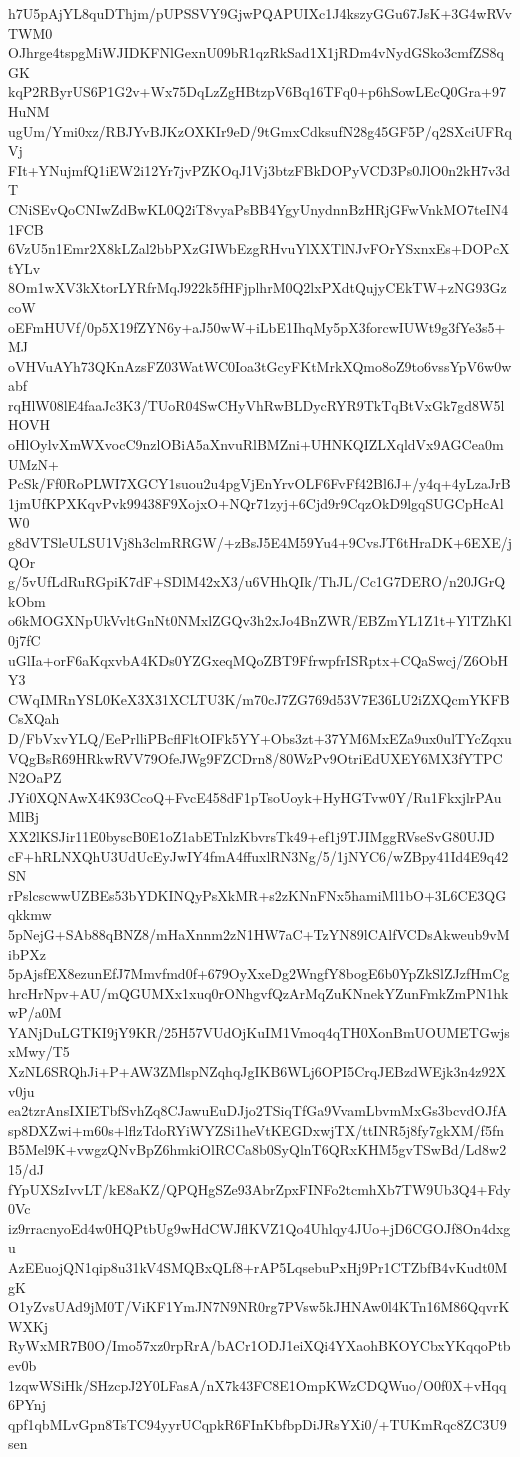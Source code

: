 h7U5pAjYL8quDThjm/pUPSSVY9GjwPQAPUIXc1J4kszyGGu67JsK+3G4wRVvTWM0
OJhrge4tspgMiWJIDKFNlGexnU09bR1qzRkSad1X1jRDm4vNydGSko3cmfZS8qGK
kqP2RByrUS6P1G2v+Wx75DqLzZgHBtzpV6Bq16TFq0+p6hSowLEcQ0Gra+97HuNM
ugUm/Ymi0xz/RBJYvBJKzOXKIr9eD/9tGmxCdksufN28g45GF5P/q2SXciUFRqVj
FIt+YNujmfQ1iEW2i12Yr7jvPZKOqJ1Vj3btzFBkDOPyVCD3Ps0JlO0n2kH7v3dT
CNiSEvQoCNIwZdBwKL0Q2iT8vyaPsBB4YgyUnydnnBzHRjGFwVnkMO7teIN41FCB
6VzU5n1Emr2X8kLZal2bbPXzGIWbEzgRHvuYlXXTlNJvFOrYSxnxEs+DOPcXtYLv
8Om1wXV3kXtorLYRfrMqJ922k5fHFjplhrM0Q2lxPXdtQujyCEkTW+zNG93GzcoW
oEFmHUVf/0p5X19fZYN6y+aJ50wW+iLbE1IhqMy5pX3forcwIUWt9g3fYe3s5+MJ
oVHVuAYh73QKnAzsFZ03WatWC0Ioa3tGcyFKtMrkXQmo8oZ9to6vssYpV6w0wabf
rqHlW08lE4faaJc3K3/TUoR04SwCHyVhRwBLDycRYR9TkTqBtVxGk7gd8W5lHOVH
oHlOylvXmWXvocC9nzlOBiA5aXnvuRlBMZni+UHNKQIZLXqldVx9AGCea0mUMzN+
PcSk/Ff0RoPLWI7XGCY1suou2u4pgVjEnYrvOLF6FvFf42Bl6J+/y4q+4yLzaJrB
1jmUfKPXKqvPvk99438F9XojxO+NQr71zyj+6Cjd9r9CqzOkD9lgqSUGCpHcAlW0
g8dVTSleULSU1Vj8h3clmRRGW/+zBsJ5E4M59Yu4+9CvsJT6tHraDK+6EXE/jQOr
g/5vUfLdRuRGpiK7dF+SDlM42xX3/u6VHhQIk/ThJL/Cc1G7DERO/n20JGrQkObm
o6kMOGXNpUkVvltGnNt0NMxlZGQv3h2xJo4BnZWR/EBZmYL1Z1t+YlTZhKl0j7fC
uGlIa+orF6aKqxvbA4KDs0YZGxeqMQoZBT9FfrwpfrISRptx+CQaSwcj/Z6ObHY3
CWqIMRnYSL0KeX3X31XCLTU3K/m70cJ7ZG769d53V7E36LU2iZXQcmYKFBCsXQah
D/FbVxvYLQ/EePrlliPBcflFltOIFk5YY+Obs3zt+37YM6MxEZa9ux0ulTYcZqxu
VQgBsR69HRkwRVV79OfeJWg9FZCDrn8/80WzPv9OtriEdUXEY6MX3fYTPCN2OaPZ
JYi0XQNAwX4K93CcoQ+FvcE458dF1pTsoUoyk+HyHGTvw0Y/Ru1FkxjlrPAuMlBj
XX2lKSJir11E0byscB0E1oZ1abETnlzKbvrsTk49+ef1j9TJIMggRVseSvG80UJD
cF+hRLNXQhU3UdUcEyJwIY4fmA4ffuxlRN3Ng/5/1jNYC6/wZBpy41Id4E9q42SN
rPslcscwwUZBEs53bYDKINQyPsXkMR+s2zKNnFNx5hamiMl1bO+3L6CE3QGqkkmw
5pNejG+SAb88qBNZ8/mHaXnnm2zN1HW7aC+TzYN89lCAlfVCDsAkweub9vMibPXz
5pAjsfEX8ezunEfJ7Mmvfmd0f+679OyXxeDg2WngfY8bogE6b0YpZkSlZJzfHmCg
hrcHrNpv+AU/mQGUMXx1xuq0rONhgvfQzArMqZuKNnekYZunFmkZmPN1hkwP/a0M
YANjDuLGTKI9jY9KR/25H57VUdOjKuIM1Vmoq4qTH0XonBmUOUMETGwjsxMwy/T5
XzNL6SRQhJi+P+AW3ZMlspNZqhqJgIKB6WLj6OPI5CrqJEBzdWEjk3n4z92Xv0ju
ea2tzrAnsIXIETbfSvhZq8CJawuEuDJjo2TSiqTfGa9VvamLbvmMxGs3bcvdOJfA
sp8DXZwi+m60s+lflzTdoRYiWYZSi1heVtKEGDxwjTX/ttINR5j8fy7gkXM/f5fn
B5Mel9K+vwgzQNvBpZ6hmkiOlRCCa8b0SyQlnT6QRxKHM5gvTSwBd/Ld8w215/dJ
fYpUXSzIvvLT/kE8aKZ/QPQHgSZe93AbrZpxFINFo2tcmhXb7TW9Ub3Q4+Fdy0Vc
iz9rracnyoEd4w0HQPtbUg9wHdCWJflKVZ1Qo4Uhlqy4JUo+jD6CGOJf8On4dxgu
AzEEuojQN1qip8u31kV4SMQBxQLf8+rAP5LqsebuPxHj9Pr1CTZbfB4vKudt0MgK
O1yZvsUAd9jM0T/ViKF1YmJN7N9NR0rg7PVsw5kJHNAw0l4KTn16M86QqvrKWXKj
RyWxMR7B0O/Imo57xz0rpRrA/bACr1ODJ1eiXQi4YXaohBKOYCbxYKqqoPtbev0b
1zqwWSiHk/SHzcpJ2Y0LFasA/nX7k43FC8E1OmpKWzCDQWuo/O0f0X+vHqq6PYnj
qpf1qbMLvGpn8TsTC94yyrUCqpkR6FInKbfbpDiJRsYXi0/+TUKmRqc8ZC3U9sen
